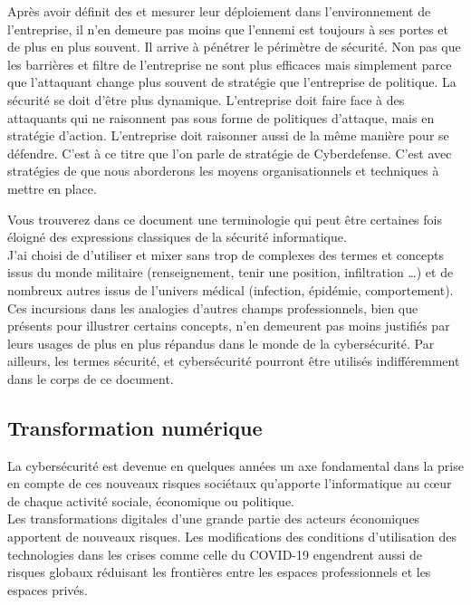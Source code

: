 Après avoir définit des  et mesurer leur déploiement dans l’environnement de l’entreprise, il n’en demeure pas moins que l’ennemi est toujours à ses portes et de plus en plus souvent. Il arrive à pénétrer le périmètre de sécurité.
Non pas que les barrières et filtre de l'entreprise ne sont plus efficaces mais simplement parce que l'attaquant change plus souvent de stratégie que l'entreprise de politique. La sécurité se doit d'être plus dynamique.
L’entreprise doit faire face à des attaquants qui ne raisonnent pas sous forme de politiques d’attaque, mais en stratégie d'action. L’entreprise doit raisonner aussi de la même manière pour se défendre. C'est à ce titre que l'on parle de stratégie de Cyberdefense.
C'est avec stratégies de  que nous aborderons les moyens organisationnels et techniques à mettre en place.

Vous trouverez  dans ce document une terminologie qui peut être certaines fois éloigné des expressions classiques de la sécurité informatique. \\
J'ai choisi de d'utiliser et mixer sans trop de complexes des termes et concepts issus du monde militaire (renseignement, tenir une position, infiltration …) et de nombreux autres issus de l'univers médical (infection, épidémie, comportement).\\ Ces incursions dans les analogies d'autres champs professionnels, bien que présents pour illustrer certains concepts, n'en demeurent pas moins justifiés par leurs usages de plus en plus répandus dans le monde de la cybersécurité. Par ailleurs, les termes sécurité, et cybersécurité pourront être utilisés indifféremment dans le corps de ce document.

\subsection {Transformation numérique}


La cybersécurité est devenue en quelques années un axe fondamental dans la prise en compte de ces nouveaux risques sociétaux qu'apporte l'informatique au cœur de chaque activité sociale, économique ou politique. \\

Les  transformations digitales d'une grande partie des acteurs économiques apportent de nouveaux risques. Les modifications des conditions d'utilisation des technologies dans les crises comme celle du COVID-19 engendrent aussi de risques globaux réduisant les frontières entre les espaces professionnels et les espaces privés.

